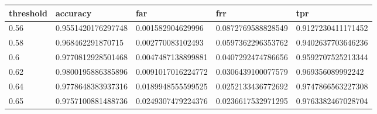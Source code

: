 \begin{table}
\centering
\begin{tabular}{lllll}
\toprule
threshold & accuracy & far & frr & tpr \\
\midrule
0.56 & 0.9551420176297748 & 0.001582904629996 & 0.0872769588828549 & 0.9127230411171452 \\
0.58 & 0.968462291870715 & 0.002770083102493 & 0.0597362296353762 & 0.9402637703646236 \\
0.6 & 0.9770812928501468 & 0.0047487138899881 & 0.0407292474786656 & 0.9592707525213344 \\
0.62 & 0.9800195886385896 & 0.0091017016224772 & 0.0306439100077579 & 0.969356089992242 \\
0.64 & 0.9778648383937316 & 0.0189948555599525 & 0.0252133436772692 & 0.9747866563227308 \\
0.65 & 0.9757100881488736 & 0.0249307479224376 & 0.0236617532971295 & 0.9763382467028704 \\
\bottomrule
\end{tabular}
\end{table}